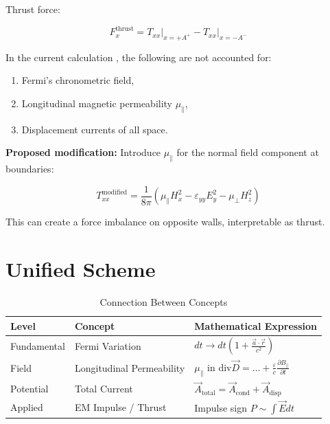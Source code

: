 \documentclass[12pt, a4paper]{article}
\begin{document}
Thrust force:

\begin{equation}
F_x^{\text{thrust}} = T_{xx}\big|_{x=+A^+} - T_{xx}\big|_{x=-A^-}
\label{eq:thrust_force}
\end{equation}

In the current calculation \cite{MenDrive}, the following are not accounted for:
\begin{enumerate}
    \item Fermi's chronometric field,
    \item Longitudinal magnetic permeability $\mu_{\parallel}$,
    \item Displacement currents of all space.
\end{enumerate}

\textbf{Proposed modification:} Introduce $\mu_{\parallel}$ for the normal field component at boundaries:

\begin{equation}
T_{xx}^{\text{modified}} = \frac{1}{8\pi} \left( \mu_{\parallel} H_x^2 - \varepsilon_{yy} E_y^2 - \mu_{\perp} H_z^2 \right)
\label{eq:stress_tensor_modified}
\end{equation}

This can create a force imbalance on opposite walls, interpretable as thrust.

\section{Unified Scheme}

\begin{table}[h]
\centering
\caption{Connection Between Concepts}
\begin{tabular}{|l|l|l|}
\hline
\textbf{Level} & \textbf{Concept} & \textbf{Mathematical Expression} \\
\hline
Fundamental & Fermi Variation & $dt \to dt(1 + \frac{\vec{a}\cdot\vec{r}}{c^2})$ \\
\hline
Field & Longitudinal Permeability & $\mu_{\parallel}$ in $\text{div}\vec{D} = \dots + \frac{\varepsilon}{c}\frac{\partial B_{\parallel}}{\partial t}$ \\
\hline
Potential & Total Current & $\vec{A}_{\text{total}} = \vec{A}_{\text{cond}} + \vec{A}_{\text{disp}}$ \\
\hline
Applied & EM Impulse / Thrust & Impulse sign $P \sim \int \vec{E} dt$ \\
\hline
\end{tabular}
\label{tab:unified}
\end{table}
\end{document}
